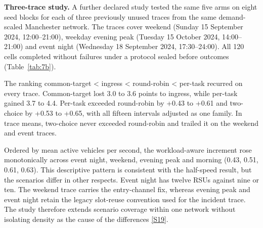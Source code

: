 \documentclass[12pt,a4paper]{article}
\begin{document}
\textbf{Three-trace study.} A further declared study tested the same five arms on eight seed blocks for each of three previously unused traces from the same demand-scaled Manchester network. The traces cover weekend (Sunday 15 September 2024, 12:00--21:00), weekday evening peak (Tuesday 15 October 2024, 14:00--21:00) and event night (Wednesday 18 September 2024, 17:30--24:00). All 120 cells completed without failures under a protocol sealed before outcomes (Table~\ref{tab:7b}).

The ranking common-target < ingress < round-robin < per-task recurred on every trace. Common-target lost 3.0 to 3.6 points to ingress, while per-task gained 3.7 to 4.4. Per-task exceeded round-robin by +0.43 to +0.61 and two-choice by +0.53 to +0.65, with all fifteen intervals adjusted as one family. In trace means, two-choice never exceeded round-robin and trailed it on the weekend and event traces.

Ordered by mean active vehicles per second, the workload-aware increment rose monotonically across event night, weekend, evening peak and morning (0.43, 0.51, 0.61, 0.63). This descriptive pattern is consistent with the half-speed result, but the scenarios differ in other respects. Event night has twelve RSUs against nine or ten. The weekend trace carries the entry-channel fix, whereas evening peak and event night retain the legacy slot-reuse convention used for the incident trace. The study therefore extends scenario coverage within one network without isolating density as the cause of the differences \hyperref[source-s19]{[S19]}.
\end{document}
